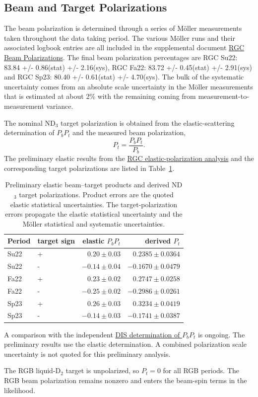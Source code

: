 \subsection{Beam and Target Polarizations}
\label{sec::polarization}
The beam polarization is determined through a series of M\"{o}ller measurements taken throughout the data taking period. The various M\"{o}ller runs and their associated logbook entries are all included in the supplemental document \href{https://clas12-docdb.jlab.org/DocDB/0012/001257/001/rgc_beam_polarizations.txt}{RGC Beam Polarizations}. The final beam polarization percentages are RGC Su22: 83.84 +/- 0.86(stat) +/- 2.16(sys), RGC Fa22: 83.72 +/- 0.45(stat) +/- 2.91(sys) and RGC Sp23: 80.40 +/- 0.61(stat) +/- 4.70(sys). The bulk of the systematic uncertainty comes from an absolute scale uncertainty in the M\"{o}ller measurements that is estimated at about 2\% with the remaining coming from measurement-to-measurement variance.

The nominal ND$_3$ target polarization is obtained from the elastic-scattering determination of $P_bP_t$ and the measured beam polarization,
\begin{equation}\label{eq:target_polarization}
P_t=\frac{P_bP_t}{P_b}.
\end{equation}
The preliminary elastic results from the \href{https://clasweb.jlab.org/wiki/index.php/Elastic_Analysis_for_PbPt_Extraction}{RGC elastic-polarization analysis} and the corresponding target polarizations are listed in Table~\ref{tab:pt_by_period}.
\begin{table}[H]\centering\small
\begin{tabular}{llrr}\toprule Period & target sign & elastic $P_bP_t$ & derived $P_t$\\\midrule
Su22 & + & $0.20\pm0.03$ & $0.2385\pm0.0364$ \\
Su22 & - & $-0.14\pm0.04$ & $-0.1670\pm0.0479$ \\
Fa22 & + & $0.23\pm0.02$ & $0.2747\pm0.0258$ \\
Fa22 & - & $-0.25\pm0.02$ & $-0.2986\pm0.0261$ \\
Sp23 & + & $0.26\pm0.03$ & $0.3234\pm0.0419$ \\
Sp23 & - & $-0.14\pm0.03$ & $-0.1741\pm0.0387$ \\
\bottomrule\end{tabular}
\caption{Preliminary elastic beam--target products and derived ND$_3$ target polarizations. Product errors are the quoted elastic statistical uncertainties. The target-polarization errors propagate the elastic statistical uncertainty and the M\"{o}ller statistical and systematic uncertainties.}\label{tab:pt_by_period}\end{table}

A comparison with the independent \href{https://clasweb.jlab.org/wiki/index.php/DIS_Analysis_for_PbPt_Extraction}{DIS determination of $P_bP_t$} is ongoing. The preliminary results use the elastic determination. A combined polarization scale uncertainty is not quoted for this preliminary analysis.

The RGB liquid-D$_2$ target is unpolarized, so $P_t=0$ for all RGB periods. The RGB beam polarization remains nonzero and enters the beam-spin terms in the likelihood.
